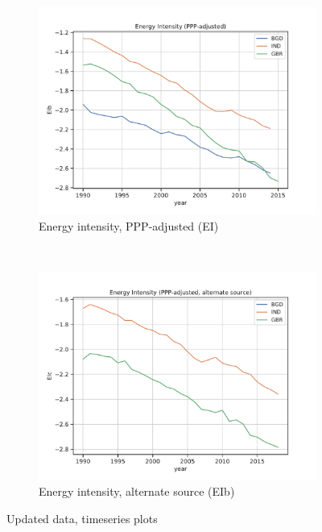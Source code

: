 \documentclass[11pt,a4paper]{article}
\begin{document}
\begin{figure}[htbp]\ContinuedFloat
\centering
\begin{subfigure}{0.9\textwidth}
\includegraphics[width=\textwidth]{./plots/EIb_timeseries.pdf}
\caption{Energy intensity, PPP-adjusted (EI)}
\end{subfigure}\\
\begin{subfigure}{0.9\textwidth}
\includegraphics[width=\textwidth]{./plots/EIc_timeseries.pdf}
\caption{Energy intensity, alternate source (EIb)}
\end{subfigure}
\caption{Updated data, timeseries plots}
\end{figure}
\end{document}
